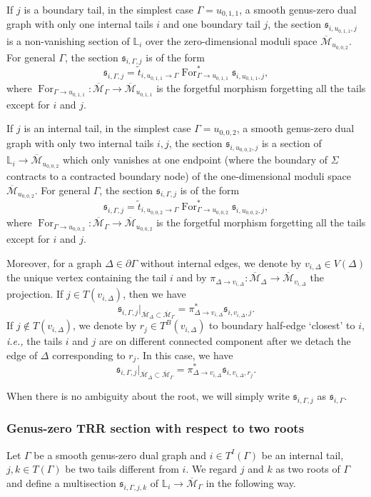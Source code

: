 \documentclass[11pt]{amsart}
\theoremstyle{definition}
\theoremstyle{remark}
\newcommand{\<}{\left<}
\renewcommand{\>}{\right>}
\numberwithin{equation}{section}
\def\Mbar{{\overline{\mathcal M}}}
\begin{document}
If $j$ is a boundary tail, in the simplest case $\Gamma=u_{0,1,1}$, a smooth genus-zero dual graph with only one internal tails $i$ and one boundary tail $j$, the section $\mathfrak s_{i,u_{0,1,1},j}$ is a non-vanishing section of $\mathbb L_i$ over the zero-dimensional moduli space $\Mbar_{u_{0,0,2}}$. For general $\Gamma$, the section $\mathfrak s_{i,\Gamma,j}$ is of the form
$$
\mathfrak s_{i,\Gamma,j}=\tilde{t}_{i,u_{0,1,1}\to \Gamma }\operatorname{For}^*_{\Gamma \to u_{0,1,1}}\mathfrak s_{i,u_{0,1,1},j}, 
$$
where $\operatorname{For}_{\Gamma \to u_{0,1,1}}\colon \Mbar_\Gamma \to \Mbar_{u_{0,1,1}}$ is the forgetful morphism forgetting all the tails except for $i$ and $j$. 

If $j$ is an internal tail, in the simplest case $\Gamma=u_{0,0,2}$, a smooth genus-zero dual graph with only two internal tails $i,j$, the section $\mathfrak s_{i,u_{0,0,2},j}$ is a section of $\mathbb L_i\to \Mbar_{u_{0,0,2}}$ which only vanishes at one endpoint (where the boundary of $\Sigma$ contracts to a contracted boundary node) of the one-dimensional moduli space $\Mbar_{u_{0,0,2}}$. For general $\Gamma$, the section $\mathfrak s_{i,\Gamma,j}$ is of the form
$$
\mathfrak s_{i,\Gamma,j}=\tilde{t}_{i,u_{0,0,2}\to \Gamma }\operatorname{For}^*_{\Gamma \to u_{0,0,2}}\mathfrak s_{i,u_{0,0,2},j}, 
$$
where $\operatorname{For}_{\Gamma \to u_{0,0,2}}\colon \Mbar_\Gamma \to \Mbar_{u_{0,0,2}}$ is the forgetful morphism forgetting all the tails except for $i$ and $j$. 

Moreover, for a graph $\Delta\in \partial \Gamma$ without internal edges, we denote by $v_{i,\Delta}\in V(\Delta)$ the unique vertex containing the tail $i$ and by $\pi_{\Delta \to v_{i,\Delta}}\colon \Mbar_{\Delta}\to \Mbar_{v_{i,\Delta}}$ the projection. If $j\in T(v_{i,\Delta})$, then we have 
$$
\mathfrak s_{i,\Gamma,j}\vert_{\Mbar_{\Delta} \subset \Mbar_{\Gamma}}= \pi^*_{\Delta \to v_{i,\Delta}}\mathfrak s_{i,v_{i,\Delta},j}.
$$
If $j\notin T(v_{i,\Delta})$, we denote by $r_j\in T^B(v_{i,\Delta})$ to boundary half-edge `closest' to $i$, \textit{i.e.,} the tails $i$ and $j$ are on different connected component after we detach the edge of $\Delta$ corresponding to $r_j$. In this case, we have 
$$
\mathfrak s_{i,\Gamma,j}\vert_{\Mbar_{\Delta} \subset \Mbar_{\Gamma}}= \pi^*_{\Delta \to v_{i,\Delta}}\mathfrak s_{i,v_{i,\Delta},r_j}.
$$

When there is no ambiguity about the root, we will simply write $\mathfrak s_{i,\Gamma,j}$ as $\mathfrak s_{i,\Gamma}$.

\subsubsection{Genus-zero TRR section with respect to two roots}
Let $\Gamma$ be a smooth genus-zero dual graph and $i\in T^I(\Gamma)$ be an internal tail, $j,k\in T(\Gamma)$ be two tails different from $i$. We regard $j$ and $k$ as two roots of $\Gamma$ and define a multisection $\mathfrak s_{i,\Gamma,j,k}$ of $\mathbb L_i \to \Mbar_{\Gamma}$ in the following way.
\end{document}
